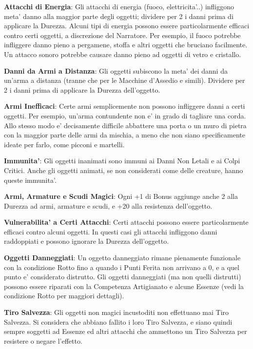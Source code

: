 \documentclass[a4paper,11pt,twoside,openany]{book}
\begin{document}
{		\bigskip
		
		\textbf{Attacchi di Energia}: Gli attacchi di energia (fuoco, elettricita'..) infliggono meta' danno alla maggior parte degli oggetti; dividere per 2 i danni prima di applicare la Durezza. Alcuni tipi di energia possono essere particolarmente efficaci contro certi oggetti, a discrezione del Narratore. 
		Per esempio, il fuoco potrebbe infliggere danno pieno a pergamene, stoffa e altri oggetti che bruciano facilmente. Un attacco sonoro potrebbe causare danno pieno ad oggetti di vetro e cristallo.
		
		\textbf{Danni da Armi a Distanza}: Gli oggetti subiscono la meta' dei danni da un'arma a distanza (tranne che per le Macchine d'Assedio e simili). Dividere per 2 i danni prima di applicare la Durezza dell'oggetto.
		
		\textbf{Armi Inefficaci}: Certe armi semplicemente non possono infliggere danni a certi oggetti. Per esempio, un'arma contundente non e' in grado di tagliare una corda.
		Allo stesso modo e' decisamente difficile abbattere una porta o un muro di pietra con la maggior parte delle armi da mischia, a meno che non siano specificamente ideate per farlo, come picconi e martelli.
		
		\textbf{Immunita'}: Gli oggetti inanimati sono immuni ai Danni Non Letali e ai Colpi Critici. Anche gli oggetti animati, se non considerati come delle creature, hanno queste immunita'.
		
		\textbf{Armi, Armature e Scudi Magici}: Ogni +1 di Bonus aggiunge anche 2 alla Durezza ad armi, armature e scudi, e +20 alla resistenza dell'oggetto.
		
		\textbf{Vulnerabilita' a Certi Attacchi}: Certi attacchi possono essere particolarmente efficaci contro alcuni oggetti. In questi casi gli attacchi infliggono danni raddoppiati e possono ignorare la Durezza dell'oggetto.
		
		\textbf{Oggetti Danneggiati}: Un oggetto danneggiato rimane pienamente funzionale con la condizione Rotto fino a quando i Punti Ferita non arrivano a 0, e a quel punto e' considerato distrutto. Gli oggetti danneggiati (ma non quelli distrutti) possono essere riparati con la Competenza Artigianato e alcune Essenze (vedi la condizione Rotto per maggiori dettagli).
		
		\textbf{Tiro Salvezza}: Gli oggetti non magici incustoditi non effettuano mai Tiro Salvezza. Si considera che abbiano fallito i loro Tiro Salvezza, e siano quindi sempre soggetti ad Essenze ed altri attacchi che ammettono un Tiro Salvezza per resistere o negare l'effetto.
		
}
\end{document}
